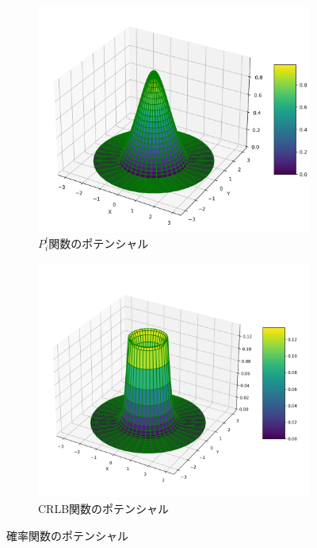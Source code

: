 \begin{figure}[H]
    \vspace{0.5cm}
    \begin{subfigure}[b]{0.45\linewidth}
        \includegraphics[width=\linewidth]{fig/p_function_potential.png}
        \caption{$P_i^l$関数のポテンシャル}
        \label{fig:p_function_potential}
    \end{subfigure}
    \hfill
    \begin{subfigure}[b]{0.45\linewidth}
        \includegraphics[width=\linewidth]{fig/covariance_function_potential.png}
        \caption{CRLB関数のポテンシャル}
        \label{fig:covariance_function_potential}
    \end{subfigure}
    \caption{確率関数のポテンシャル}
    \label{fig:potential_comparison}
\end{figure}

